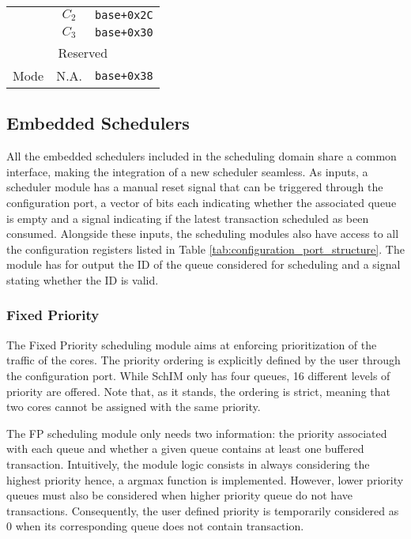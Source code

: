 \begin{table}[!ht]
\begin{tabular}{|c||c|c|}
    & $C_{2}$                                   & \verb|base+0x2C|                    \\ \cline{2-3} 
    & $C_{3}$                                   & \verb|base+0x30|                    \\ \hline
    \multicolumn{3}{|c|}{Reserved}                                                                                              \\ \hline
    Mode                                      & N.A.                                      & \verb|base+0x38|                    \\ \hline
  \end{tabular}
\end{table}


\subsection{Embedded Schedulers}
All the embedded schedulers included in the scheduling domain share a
common interface, making the integration of a new scheduler
seamless. As inputs, a scheduler module has a manual reset signal that
can be triggered through the configuration port, a vector of bits each
indicating whether the associated queue is empty and a signal
indicating if the latest transaction scheduled as been
consumed. Alongside these inputs, the scheduling modules also have
access to all the configuration registers listed in Table
\ref{tab:configuration_port_structure}. The module has for output the
ID of the queue considered for scheduling and a signal stating whether
the ID is valid.

\subsubsection{Fixed Priority}
The Fixed Priority scheduling module aims at enforcing prioritization
of the traffic of the cores. The priority ordering is explicitly
defined by the user through the configuration port. While SchIM only
has four queues, 16 different levels of priority are offered. Note
that, as it stands, the ordering is strict, meaning that two cores
cannot be assigned with the same priority.

The FP scheduling module only needs two information: the priority
associated with each queue and whether a given queue contains at least
one buffered transaction. Intuitively, the module logic consists in
always considering the highest priority hence, a argmax function is
implemented. However, lower priority queues must also be considered
when higher priority queue do not have transactions. Consequently, the
user defined priority is temporarily considered as 0 when its
corresponding queue does not contain transaction.

